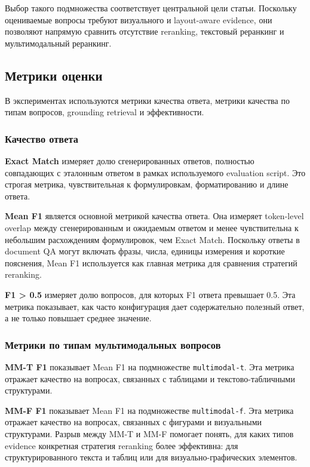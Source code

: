 \documentclass[conference]{IEEEtran}
\begin{document}
Выбор такого подмножества соответствует центральной цели статьи. Поскольку оцениваемые вопросы требуют визуального и layout-aware evidence, они позволяют напрямую сравнить отсутствие reranking, текстовый реранкинг и мультимодальный реранкинг.

\subsection{Метрики оценки}

В экспериментах используются метрики качества ответа, метрики качества по типам вопросов, grounding retrieval и эффективности.

\subsubsection{Качество ответа}

\textbf{Exact Match} измеряет долю сгенерированных ответов, полностью совпадающих с эталонным ответом в рамках используемого evaluation script. Это строгая метрика, чувствительная к формулировкам, форматированию и длине ответа.

\textbf{Mean F1} является основной метрикой качества ответа. Она измеряет token-level overlap между сгенерированным и ожидаемым ответом и менее чувствительна к небольшим расхождениям формулировок, чем Exact Match. Поскольку ответы в document QA могут включать фразы, числа, единицы измерения и короткие пояснения, Mean F1 используется как главная метрика для сравнения стратегий reranking.

\textbf{F1 > 0.5} измеряет долю вопросов, для которых F1 ответа превышает 0.5. Эта метрика показывает, как часто конфигурация дает содержательно полезный ответ, а не только повышает среднее значение.

\subsubsection{Метрики по типам мультимодальных вопросов}

\textbf{MM-T F1} показывает Mean F1 на подмножестве \texttt{multimodal-t}. Эта метрика отражает качество на вопросах, связанных с таблицами и текстово-табличными структурами.

\textbf{MM-F F1} показывает Mean F1 на подмножестве \texttt{multimodal-f}. Эта метрика отражает качество на вопросах, связанных с фигурами и визуальными структурами. Разрыв между MM-T и MM-F помогает понять, для каких типов evidence конкретная стратегия reranking более эффективна: для структурированного текста и таблиц или для визуально-графических элементов.
\end{document}
